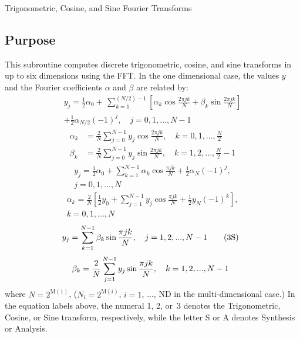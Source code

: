 \documentclass[twoside]{MATH77}
\begin{document}
 Trigonometric, Cosine, and Sine Fourier Transforms


\subsection{Purpose}

This subroutine computes discrete trigonometric, cosine, and sine transforms
in up to six dimensions using the FFT. In the one dimensional case, the
values $y$ and the Fourier coefficients $\alpha $ and $\beta $ are related
by:
\begin{multline}
y_j=\frac 12\alpha _0+\,\sum_{k=1}^{(N/2)-1}\left[ \alpha _k\cos \frac{2\pi
jk}N+\beta _k\sin \frac{2\pi jk}N\right]\\
+\frac 12\alpha _{N/2}(-1)^j,\quad j=0,1,...,N-1\tag{1S}
\end{multline}\vspace{-10pt}
\renewcommand{\theequation}{\arabic{equation}A}
\begin{equation}
\begin{split}
\alpha _k&=\frac 2N\sum_{j=0}^{N-1}y_j\cos \frac{2\pi jk}N,\quad
k=0,1,...,\frac N2\\
\beta _k&=\frac 2N\sum_{j=0}^{N-1}y_j\sin \frac{2\pi jk}N,\quad
k=1,2,...,\frac N2-1
\end{split}
\end{equation}\vspace{-10pt}
\begin{multline}
y_j=\frac 12\alpha _0+\sum_{k=1}^{N-1}\alpha _k\cos \frac{\pi jk}N+\frac
12\alpha _N(-1)^j,\\
j=0,1,...,N\tag{2S}
\end{multline}\vspace{-20pt}
\begin{multline}
\alpha _k=\frac 2N\left[ \frac 12y_0+\sum_{j=1}^{N-1}y_j\cos \frac{\pi jk}%
N+\frac 12y_N(-1)^k\right] ,\\
k=0,1,...,N
\end{multline}\vspace{-20pt}
\begin{equation}
\hspace{-5pt}y_j=\sum_{k=1}^{N-1}\beta _k\sin \frac{\pi jk}N,\quad j=1,2,...,N-1%
\tag{3S}
\end{equation}\vspace{-10pt}
\begin{equation}
\hspace{-5pt}\beta _k=\frac 2N\sum_{j=1}^{N-1}y_j\sin
\frac{\pi jk}N,\quad k=1,2,...,N-1
\end{equation}
where $N =2^{\text{M}(1)}$, ($N_i=2^{\text{M}(i)}$, $i=1$, ..., ND in the
multi-dimensional case.) In the equation labels above, the numeral 1, 2,
or~3 denotes the Trigonometric, Cosine, or Sine transform, respectively,
while the letter S or A denotes Synthesis or Analysis.
\renewcommand{\theequation}{\arabic{equation}}
\end{document}
